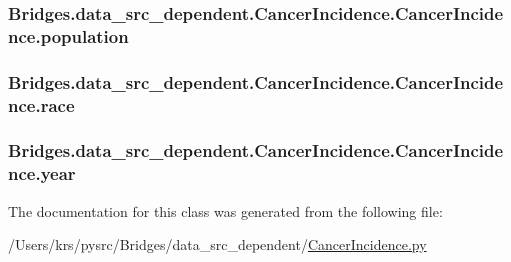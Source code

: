 \subsubsection[{population}]{\setlength{\rightskip}{0pt plus 5cm}Bridges.\+data\+\_\+src\+\_\+dependent.\+Cancer\+Incidence.\+Cancer\+Incidence.\+population}\label{class_bridges_1_1data__src__dependent_1_1_cancer_incidence_1_1_cancer_incidence_a8ed410c0107feb9a04b727d05f2f25f5}
\hypertarget{class_bridges_1_1data__src__dependent_1_1_cancer_incidence_1_1_cancer_incidence_a48e8cf5895e011e4b063dcfab14e1ab6}{}
\subsubsection[{race}]{\setlength{\rightskip}{0pt plus 5cm}Bridges.\+data\+\_\+src\+\_\+dependent.\+Cancer\+Incidence.\+Cancer\+Incidence.\+race}\label{class_bridges_1_1data__src__dependent_1_1_cancer_incidence_1_1_cancer_incidence_a48e8cf5895e011e4b063dcfab14e1ab6}
\hypertarget{class_bridges_1_1data__src__dependent_1_1_cancer_incidence_1_1_cancer_incidence_aa7db0d595c9525a03949323b54f18348}{}
\subsubsection[{year}]{\setlength{\rightskip}{0pt plus 5cm}Bridges.\+data\+\_\+src\+\_\+dependent.\+Cancer\+Incidence.\+Cancer\+Incidence.\+year}\label{class_bridges_1_1data__src__dependent_1_1_cancer_incidence_1_1_cancer_incidence_aa7db0d595c9525a03949323b54f18348}


The documentation for this class was generated from the following file\+:\begin{DoxyCompactItemize}
\item 
/\+Users/krs/pysrc/\+Bridges/data\+\_\+src\+\_\+dependent/\hyperlink{_cancer_incidence_8py}{Cancer\+Incidence.\+py}\end{DoxyCompactItemize}
